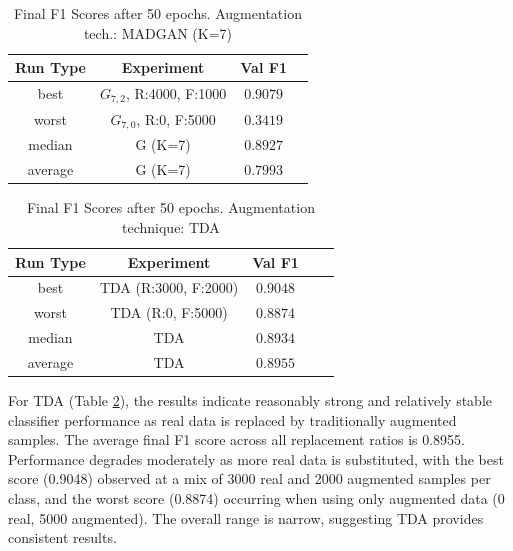\begin{table}[H]
	\vspace{-1.5em}
	\centering
	\begin{tabular}{|c|c|c|c|}
		\hline
		Run Type & Experiment & Val F1 \\ \hline
		best & \(G_{7, 2}\), R:4000, F:1000 & $0.9079$\\ \hline
		worst & \(G_{7, 0}\), R:0, F:5000 & $0.3419$\\ \hline
		median & G (K=7) & $0.8927$\\ \hline
		average & G (K=7) & $0.7993$
		\\ \hline
	\end{tabular}
    \caption{Final F1 Scores after 50 epochs. Augmentation tech.: MADGAN (K=7)}
        \label{tab:res_replacement_fashion_tda_vs_madgan__madgan}
\end{table}
\begin{table}[H]
	\centering
	\vspace{-1.5em}
	\begin{tabular}{|c|c|c|c|c|}
		\hline
		Run Type & Experiment & Val F1 \\ \hline
		best & TDA (R:3000, F:2000) & $0.9048$\\ \hline
		worst & TDA (R:0, F:5000) & $0.8874$\\ \hline
		median & TDA & $0.8934$\\ \hline
		average & TDA & $0.8955$
		\\ \hline
	\end{tabular}
    \caption{Final F1 Scores after 50 epochs. Augmentation technique: TDA}
        \label{tab:res_replacement_fashion_tda_vs_madgan__tda}
\end{table}
For TDA (Table \ref{tab:res_replacement_fashion_tda_vs_madgan__tda}), the results indicate reasonably strong and relatively stable classifier performance as real data is replaced by traditionally augmented samples. The average final F1 score across all replacement ratios is 0.8955. Performance degrades moderately as more real data is substituted, with the best score (0.9048) observed at a mix of 3000 real and 2000 augmented samples per class, and the worst score (0.8874) occurring when using only augmented data (0 real, 5000 augmented). The overall range is narrow, suggesting TDA provides consistent results.

